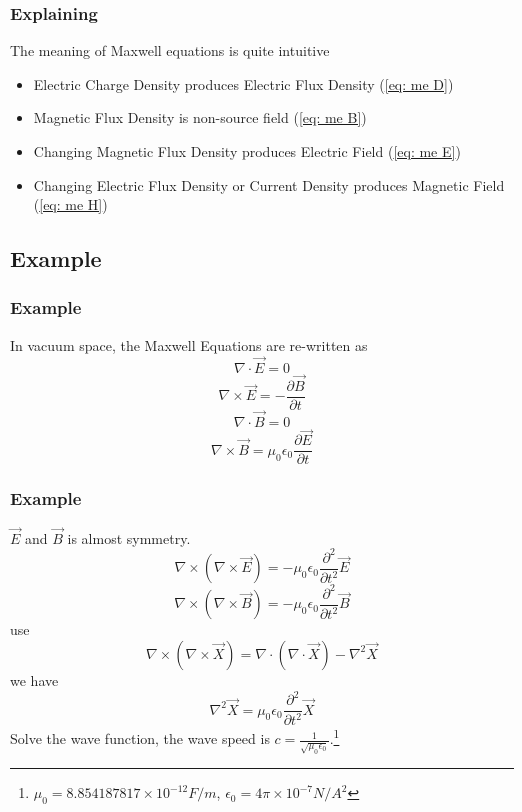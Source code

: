 \documentclass{beamer}
\begin{document}
\begin{frame}
    \frametitle{Explaining}
    The meaning of Maxwell equations is quite intuitive
    \begin{itemize}
        \item Electric Charge Density produces Electric Flux Density (\ref{eq: me D})
        \item Magnetic Flux Density is non-source field (\ref{eq: me B})
        \item Changing Magnetic Flux Density produces Electric Field (\ref{eq: me E})
        \item Changing Electric Flux Density or Current Density produces Magnetic Field (\ref{eq: me H})
    \end{itemize}

\end{frame}
\subsection{Example}
\begin{frame}
    \frametitle{Example}
    In vacuum space, the Maxwell Equations are re-written as
    \begin{equation}
        \nabla \cdot \vec{E} = 0
    \end{equation}
    \begin{equation}
        \nabla \times \vec{E} = - \frac{\partial{\vec{B}}}{\partial{t}}
    \end{equation}
    \begin{equation}
        \nabla \cdot \vec{B} = 0
    \end{equation}
    \begin{equation}
        \nabla \times \vec{B} = \mu_{0} \epsilon_{0} \frac{\partial{\vec{E}}}{\partial{t}}
    \end{equation}
\end{frame}

\begin{frame}
    \frametitle{Example}
    $\vec{E}$ and $\vec{B}$ is almost symmetry.
    \begin{equation}
        \nabla \times (\nabla \times \vec{E}) =
        - \mu_{0} \epsilon_{0} \frac{\partial^{2}}{\partial{t^{2}}} \vec{E}
    \end{equation}
    \begin{equation}
        \nabla \times (\nabla \times \vec{B}) = - \mu_{0} \epsilon_{0} \frac{\partial^{2}}{\partial{t^{2}}} \vec{B}
    \end{equation}
    use
    \begin{equation}
        \nabla \times (\nabla \times \vec{X}) =
        \nabla \cdot (\nabla \cdot \vec{X}) - \nabla^{2} \vec{X}
    \end{equation}
    we have
    \begin{equation}
        \nabla^{2} \vec{X} = \mu_{0} \epsilon_{0} \frac{\partial^{2}}{\partial{t^{2}}} \vec{X}
    \end{equation}
    Solve the wave function, the wave speed is $c=\frac{1}{\sqrt{\mu_{0} \epsilon_{0}}}$.\footnote{$\mu_{0}=8. 854187817 \times 10^{-12} F/m$, $\epsilon_{0}=4 \pi \times 10^{-7} N/A^{2}$}
\end{frame}
\end{document}

